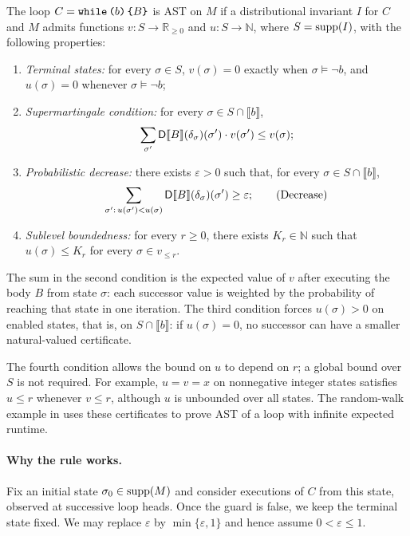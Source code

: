 \begin{theorem}
\label{thm:program-rule}
The loop $C=\textnormal{\texttt{while}}\,\textnormal{\texttt{(}} b\textnormal{\texttt{)}}\,\textnormal{\texttt{\{}} B\textnormal{\texttt{\}}}$ is AST on $M$ if a distributional invariant $I$ for $C$
and $M$ admits functions $v:S\to\mathbb R_{\geq0}$ and
$u:S\to\mathbb N$, where $S=\textnormal{supp}(I)$, with the following properties:
\begin{enumerate}
 \item \emph{Terminal states:} for every $\sigma\in S$,
 $v(\sigma)=0$ exactly when $\sigma\models\neg b$, and
 $u(\sigma)=0$ whenever $\sigma\models\neg b$;
 \item \emph{Supermartingale condition:} for every
 $\sigma\in S\cap\llbracket b\rrbracket$,
 \[
   \sum_{\sigma'}\mathsf{D}\llbracket B\rrbracket(\delta_{\sigma})(\sigma')\cdot v(\sigma')
     \leq v(\sigma);
 \]
 \item \emph{Probabilistic decrease:} there exists $\varepsilon>0$
 such that, for every $\sigma\in S\cap\llbracket b\rrbracket$,
 \[
   \sum_{\sigma':\,u(\sigma')<u(\sigma)}
      \mathsf{D}\llbracket B\rrbracket(\delta_{\sigma})(\sigma')\geq\varepsilon;
   \tag{Decrease}
 \]
 \item \emph{Sublevel boundedness:} for every $r\geq0$, there exists
 $K_r\in\mathbb N$ such that $u(\sigma)\leq K_r$ for every
 $\sigma\in v_{\leq r}$.
\end{enumerate}
\end{theorem}
The sum in the second condition is the expected value of $v$ after
executing the body $B$ from state $\sigma$: each successor value is
weighted by the probability of reaching that state in one iteration.
The third condition forces $u(\sigma)>0$ on enabled states, that is, on
$S\cap\llbracket b\rrbracket$: if $u(\sigma)=0$, no successor can
have a smaller natural-valued certificate.

The fourth condition allows the bound on $u$ to depend on $r$; a global
bound over $S$ is not required. For example, $u=v=x$ on nonnegative
integer states satisfies $u\leq r$ whenever $v\leq r$, although $u$
is unbounded over all states. The random-walk example in
 uses these certificates to prove AST of a loop
with infinite expected runtime.

\paragraph{Why the rule works.}
Fix an initial state $\sigma_0\in\textnormal{supp}(M)$ and consider executions of
$C$ from this state, observed at successive loop heads. Once the guard
is false, we keep the terminal state fixed.
We may replace $\varepsilon$ by $\min\{\varepsilon,1\}$ and hence assume
$0<\varepsilon\leq1$.

